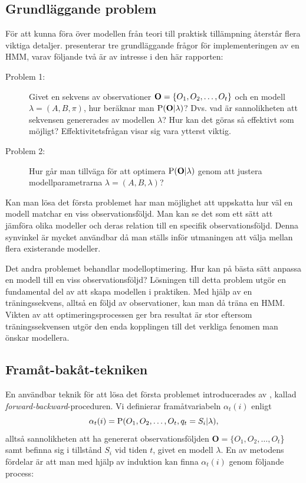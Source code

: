 \documentclass[../rapport_MVEX01-11-05]{subfiles}
\begin{document}
\subsection{Grundläggande problem}
För att kunna föra över modellen från teori till praktisk tillämpning
återstår flera viktiga detaljer.  presenterar
tre grundläggande frågor för implementeringen av en HMM, varav följande
två är av intresse i den här rapporten:
\begin{description}
\item[Problem 1:] Givet en sekvens av observationer
  $\mathbf{O}=\{O_1,O_2,\dots,O_t\}$ och en modell $\lambda = (A,B,\pi)$, hur
  beräknar man $\mathrm{P}(\mathbf{O}|\lambda)$? Dvs. vad är sannolikheten att
  sekvensen genererades av modellen $\lambda$? Hur kan
  det göras så effektivt som möjligt? Effektivitetsfrågan visar sig
  vara ytterst viktig. 
\item[Problem 2:] Hur går man tillväga för att optimera
  $\mathrm{P}(\mathbf{O}|\lambda)$ genom att justera
  modellparametrarna $\lambda = (A,B,\lambda)$? 
\end{description}

Kan man lösa det första problemet har man möjlighet att uppskatta hur
väl en modell matchar en viss observationsföljd. Man kan se det som
ett sätt att jämföra olika modeller och
deras relation till en specifik observationsföljd. Denna synvinkel är
mycket användbar då man ställs inför utmaningen att välja mellan
flera existerande modeller. 

Det andra problemet behandlar modelloptimering. Hur kan på bästa
sätt anpassa en modell till en viss observationsföljd?
Lösningen till detta problem utgör en fundamental del av
att skapa modellen i  praktiken.
Med hjälp av en träningssekvens, alltså en följd av
observationer, kan man då träna en HMM. Vikten av att
optimeringsprocessen ger bra resultat är stor eftersom
träningssekvensen utgör den enda kopplingen till det verkliga fenomen
man önskar modellera.      

\subsection{Framåt-bakåt-tekniken}
En användbar teknik för att lösa det första problemet introducerades av , kallad
\emph{forward-backward}-proceduren. Vi
definierar framåtvariabeln $\alpha_t(i)$ enligt
\begin{equation*}
\alpha_t(i) = \mathrm{P}(O_1,O_2,\dots,O_t,q_t = S_i | \lambda),
\end{equation*}
alltså sannolikheten att ha genererat observationsföljden $\textbf{O}
= \{O_1,O_2,\dots,O_t$\} samt befinna sig i tillstånd $S_i$ vid tiden
$t$, givet en modell $\lambda$. En av metodens fördelar är att man med
hjälp av induktion kan finna $\alpha_t(i)$ genom följande process:
\end{document}

